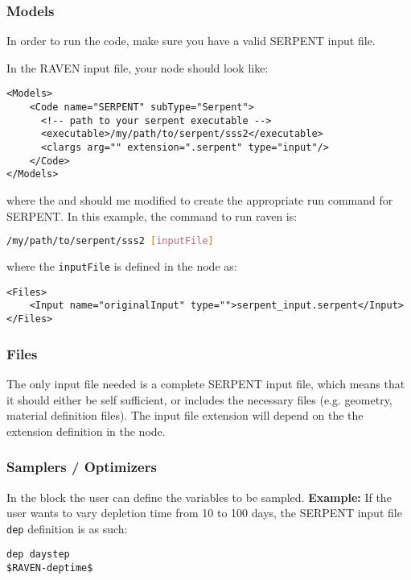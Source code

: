 \subsubsection{Models}
In order to run the code, make sure you have a valid SERPENT input file.

In the RAVEN input file, your  node should look like:
\begin{lstlisting}[style=XML]
<Models>
    <Code name="SERPENT" subType="Serpent">
      <!-- path to your serpent executable -->
      <executable>/my/path/to/serpent/sss2</executable>
      <clargs arg="" extension=".serpent" type="input"/>
    </Code>
</Models>
\end{lstlisting}
where the  and  should me modified
to create the appropriate run command for SERPENT. In this example, the command
to run raven is:
\begin{lstlisting}[language=bash]
/my/path/to/serpent/sss2 [inputFile]
\end{lstlisting}
where the \texttt{inputFile} is defined in the  node as:
\begin{lstlisting}[style=XML]
<Files>
    <Input name="originalInput" type="">serpent_input.serpent</Input>
</Files>
\end{lstlisting}

\subsubsection{Files}
The only input file needed is a complete SERPENT input file,
which means that it should either be self sufficient, or includes
the necessary files (e.g. geometry, material definition files).
The input file extension will depend on the the extension definition
in the  node.

\subsubsection{Samplers / Optimizers}
In the  block the user can define the variables
to be sampled.
\textbf{Example:} If the user wants to vary depletion time from
10 to 100 days, the SERPENT input file \texttt{dep} definition is as such:
\begin{lstlisting}
dep daystep 
$RAVEN-deptime$ 
\end{lstlisting}

